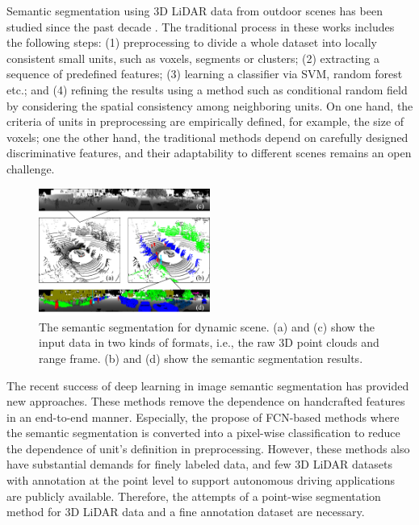 	Semantic segmentation using 3D LiDAR data from outdoor scenes has been studied since the past decade \cite{urmson2008autonomous,moosmann2009segmentation,douillard2011segmentation}. The traditional process in these works \cite{munoz2009onboard,zhao2010scene} includes the following steps: (1) preprocessing to divide a whole dataset into locally consistent small units, such as voxels, segments or clusters; (2) extracting a sequence of predefined features; (3) learning a classifier via SVM, random forest etc.; and (4) refining the results using a method such as conditional random field by considering the spatial consistency among neighboring units. On one hand, the criteria of units in preprocessing are empirically defined, for example, the size of voxels\cite{hackel2017isprs}; one the other hand, the traditional methods depend on carefully designed discriminative features, and their adaptability to different scenes remains an open challenge.
	
	\begin{figure}
		\centering
		\includegraphics[width=0.5\textwidth]{fig/Fig1.png}
		\caption{The semantic segmentation for dynamic scene. (a) and (c) show the input data in two kinds of formats, i.e., the raw 3D point clouds and range frame. (b) and (d) show the semantic segmentation results.}
		\label{fig:dynamiccampus}
	\end{figure}	
	
	The recent success of deep learning in image semantic segmentation has provided new approaches\cite{garcia2017review}. These methods remove the dependence on handcrafted features in an end-to-end manner. Especially, the propose of FCN-based methods\cite{long2015fully} where the semantic segmentation is converted into a pixel-wise classification to reduce the dependence of unit's definition in preprocessing. However, these methods also have substantial demands for finely labeled data\cite{garcia2017review}, and few 3D LiDAR datasets with annotation at the point level to support autonomous driving applications are publicly available. Therefore, the attempts of a point-wise segmentation method for 3D LiDAR data and a fine annotation dataset are necessary.
	
